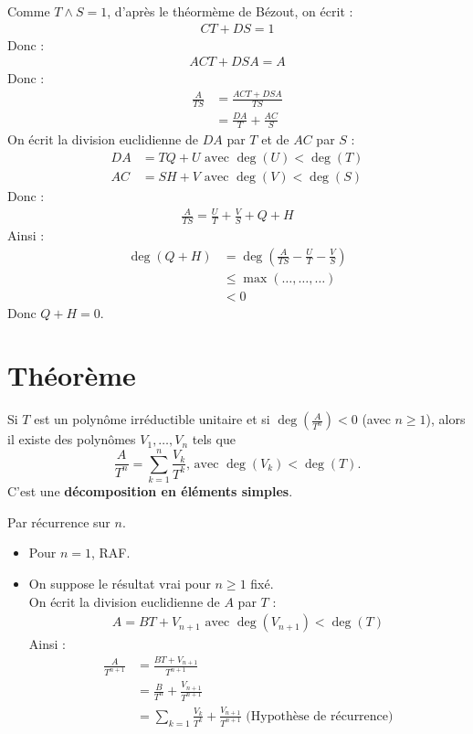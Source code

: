 \documentclass[../main.tex]{subfiles}
\begin{document}
\noindent Comme $T \wedge S = 1$, d'après le théormème de Bézout, on écrit : 
\begin{align*}
    CT + DS = 1
\end{align*}
Donc : 
\begin{align*}
    ACT + DSA = A
\end{align*}
Donc : 
\begin{align*}
    \frac{A}{TS} &= \frac{ACT + DSA}{TS} \\
    &= \frac{DA}{T} + \frac{AC}{S}
\end{align*}
On écrit la division euclidienne de $DA$ par $T$ et de $AC$ par $S$ :
\begin{align*}
    DA &= TQ + U \text{ avec } \deg(U) < \deg(T) \\
    AC &= SH + V \text{ avec } \deg(V) < \deg(S)
\end{align*}
Donc :
\begin{align*}
    \frac{A}{TS} = \frac{U}{T} + \frac{V}{S} + Q + H
\end{align*}
Ainsi : 
\begin{align*}
    \deg (Q + H) &= \deg \left( \frac{A}{TS} - \frac{U}{T} - \frac{V}{S} \right) \\
    &\leq \max(\ldots, \ldots, \ldots) \\
    &< 0
\end{align*}
Donc $Q + H = 0$. 

\section{Théorème}
\begin{tcolorbox}[title=Théorème 17.33, title filled=false, colframe=orange, colback=orange!10!white]
    Si $T$ est un polynôme irréductible unitaire et si $\deg \left( \frac{A}{T^n} \right) < 0$ (avec $n \geq 1$), alors il existe des polynômes $V_1, \ldots, V_n$ tels que
    $$\frac{A}{T^n} = \sum_{k=1}^{n} \frac{V_k}{T^k} \text{, avec } \deg(V_k) < \deg(T).$$
    C'est une \textbf{décomposition en éléments simples}.
\end{tcolorbox}

\noindent Par récurrence sur $n$. \\
\begin{itemize}
    \item Pour $n = 1$, RAF. 
    \item On suppose le résultat vrai pour $n \geq 1$ fixé. \\
    On écrit la division euclidienne de $A$ par $T$ :
    \begin{align*}
        A = BT + V_{n+1} \text{ avec } \deg(V_{n+1}) < \deg(T)
    \end{align*}
    Ainsi : 
    \begin{align*}
        \frac{A}{T^{n+1}} &= \frac{BT + V_{n+1}}{T^{n+1}} \\
        &= \frac{B}{T^n} + \frac{V_{n+1}}{T^{n+1}} \\
        &= \sum_{k=1} \frac{V_k}{T^k} + \frac{V_{n+1}}{T^{n+1}} \text{ (Hypothèse de récurrence)} 
    \end{align*}
\end{itemize}
\end{document}
